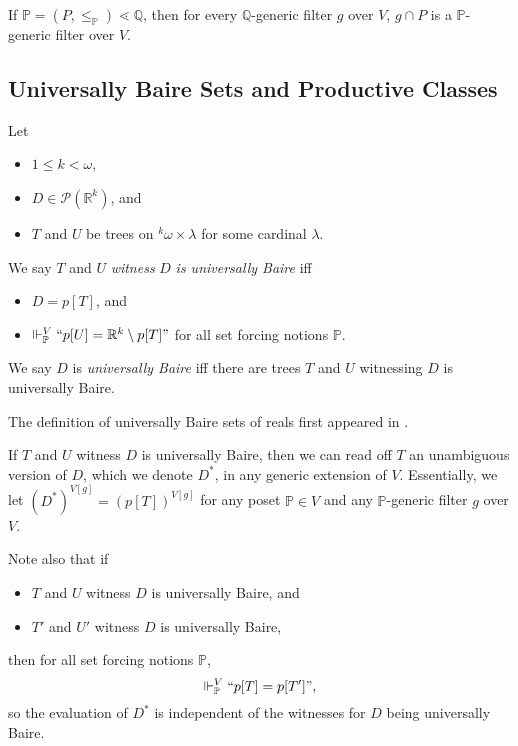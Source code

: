 \documentclass[12pt]{article}
\numberwithin{equation}{section}
\begin{document}
\begin{fact}\label{regsubo}
If $\mathbb{P} = (P, \leq_{\mathbb{P}}) \lessdot \mathbb{Q}$, then for every $\mathbb{Q}$-generic filter $g$ over $V$, $g \cap P$ is a $\mathbb{P}$-generic filter over $V$.
\end{fact}

\subsection{Universally Baire Sets and Productive Classes}\label{ss25}

\begin{defi}
Let 
\begin{itemize}
    \item $1 \leq k < \omega$, 
    \item $D \in \mathcal{P}(\mathbb{R}^k)$, and
    \item $T$ and $U$ be trees on ${^{k}{\omega}} \times \lambda$ for some cardinal $\lambda$.
\end{itemize} 
We say $T$ and $U$ \emph{witness} $D$ \emph{is universally Baire} iff 
\begin{itemize}
    \item $D = p[T]$, and
    \item $\Vdash^V_{\mathbb{P}} ``p[U] = \mathbb{R}^k \setminus p[T]"$ for all set forcing notions $\mathbb{P}$.
\end{itemize}
We say $D$ is \emph{universally Baire} iff there are trees $T$ and $U$ witnessing $D$ is universally Baire.
\end{defi}

The definition of universally Baire sets of reals first appeared in \cite[Section 2]{fmw}. 

If $T$ and $U$ witness $D$ is universally Baire, then we can read off $T$ an unambiguous version of $D$, which we denote $D^*$, in any generic extension of $V$. Essentially, we let $(D^*)^{V[g]} = (p[T])^{V[g]}$ for any poset $\mathbb{P} \in V$ and any $\mathbb{P}$-generic filter $g$ over $V$.

Note also that if
\begin{itemize}
    \item $T$ and $U$ witness $D$ is universally Baire, and
    \item $T'$ and $U'$ witness $D$ is universally Baire,
\end{itemize}
then for all set forcing notions $\mathbb{P}$, 
\begin{equation*}
    \Vdash^V_{\mathbb{P}} ``p[T] = p[T']",
\end{equation*}
so the evaluation of $D^*$ is independent of the witnesses for $D$ being universally Baire.
\end{document}
